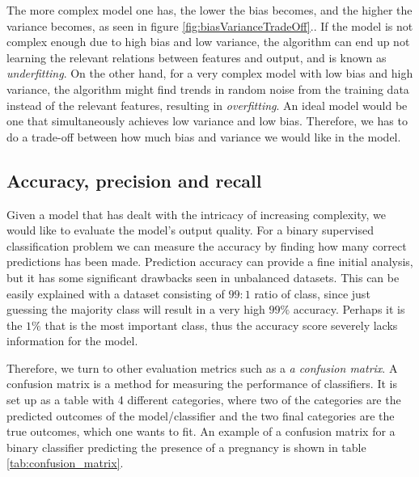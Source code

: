 

The more complex model one has, the lower the bias becomes, and the higher the variance becomes, as seen in figure \ref{fig:biasVarianceTradeOff}.. If the model is not complex enough due to high bias and low variance, the algorithm can end up not learning the relevant relations between features and output, and is known as \textit{underfitting}. On the other hand, for a very complex model with low bias and high variance, the algorithm might find trends in random noise from the training data instead of the relevant features, resulting in \textit{overfitting}. An ideal model would be one that simultaneously achieves low variance and low bias. Therefore, we has to do a trade-off between how much bias and variance we would like in the model.

\subsection{Accuracy, precision and recall}

Given a model that has dealt with the intricacy of increasing complexity, we would like to evaluate the model's output quality. For a binary supervised classification problem we can measure the accuracy by finding how many correct predictions has been made. Prediction accuracy can provide a fine initial analysis, but it has some significant drawbacks seen in unbalanced datasets. This can be easily explained with a dataset consisting of $99:1$ ratio of class, since just guessing the majority class will result in a very high $99\%$ accuracy. Perhaps it is the $1\%$ that is the most important class, thus the accuracy score severely lacks information for the model.

Therefore, we turn to other evaluation metrics such as a \textit{a confusion matrix}. A confusion matrix is a method for measuring the performance of classifiers. It is set up as a table with 4 different categories, where two of the categories are the predicted outcomes of the model/classifier and the two final categories are the true outcomes, which one wants to fit. An example of a confusion matrix for a binary classifier predicting the presence of a pregnancy is shown in table \ref{tab:confusion_matrix}.

